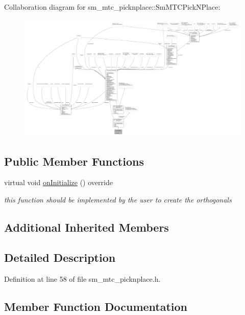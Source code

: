Collaboration diagram for sm\+\_\+mtc\+\_\+picknplace\+:\+:Sm\+M\+T\+C\+Pick\+N\+Place\+:
\nopagebreak
\begin{figure}[H]
\begin{center}
\leavevmode
\includegraphics[width=350pt]{structsm__mtc__picknplace_1_1SmMTCPickNPlace__coll__graph}
\end{center}
\end{figure}
\subsection*{Public Member Functions}
\begin{DoxyCompactItemize}
\item 
virtual void \hyperlink{structsm__mtc__picknplace_1_1SmMTCPickNPlace_aa5007775308c85c2f45302d7e3ff5837}{on\+Initialize} () override
\begin{DoxyCompactList}\small\item\em this function should be implemented by the user to create the orthogonals \end{DoxyCompactList}\end{DoxyCompactItemize}
\subsection*{Additional Inherited Members}


\subsection{Detailed Description}


Definition at line 58 of file sm\+\_\+mtc\+\_\+picknplace.\+h.



\subsection{Member Function Documentation}

